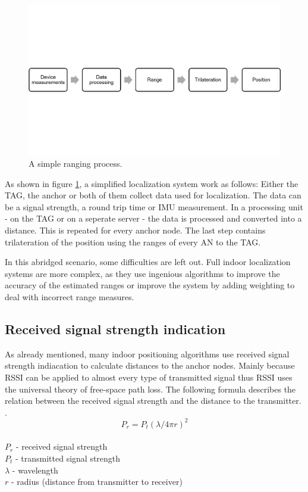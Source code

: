\begin{figure}[th]
\centering
\includegraphics[width=1.0\textwidth]{Figures/ranging_process}
\decoRule
\caption[Ranging process]{A simple ranging process.}
\label{fig:ranging_process}
\end{figure}

As shown in figure \ref{fig:ranging_process}, a simplified localization system work as follows:
Either the TAG, the anchor or both of them collect data used for localization. The data can be a signal strength, a round trip time or IMU measurement.
In a processing unit - on the TAG or on a seperate server - the data is processed and converted into a distance. This is repeated for every anchor node.
The last step contains trilateration of the position using the ranges of every AN to the TAG.

In this abridged scenario, some difficulties are left out. Full indoor localization systems are more complex, as they use ingenious algorithms to improve the accuracy of the estimated ranges or improve the system by adding weighting to deal with incorrect range measures.

\subsection{Received signal strength indication}
As already mentioned, many indoor positioning algorithms use received signal strength indiacation to calculate distances to the anchor nodes. Mainly because RSSI can be applied to almost every type of transmitted signal thus RSSI uses the universal theory of free-space path loss. The following formula describes the relation between the received signal strength and the distance to the transmitter. \cite{VorlesungCN}.
$$
P_{r} = P_{t} (\lambda/4\pi r)^2
$$
\\
$P_{r}$ - received signal strength\\
$P_{t}$ - transmitted signal strength\\
$\lambda$ - wavelength\\
$r$ - radius (distance from transmitter to receiver)\\

